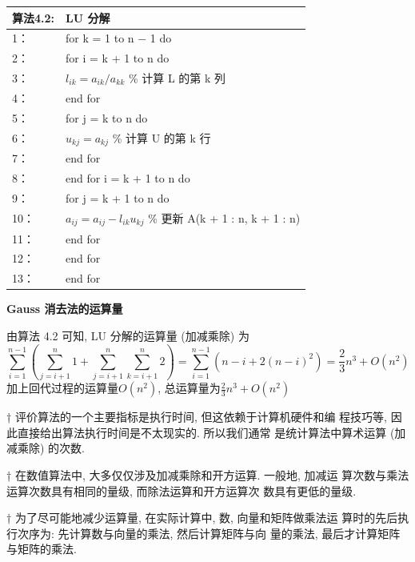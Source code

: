 \documentclass[12pt,a4paper]{article}
\begin{document}
\begin{table}  
	\begin{tabular*}{16cm}{ll}  
		\hline  
		算法4.2: &LU 分解 \\  
		\hline  
		1：   &for k = 1 to n − 1 do\\  
		2：   &\qquad for i = k + 1 to n do\\
		3：   &\qquad \qquad $l_{ik} = a_{ik}/a_{kk}$ \% 计算 L 的第 k 列\\
		4：   &\qquad end for\\
		5：   &\qquad for j = k to n do\\
		6：   &\qquad \qquad $u_{kj} = a_{kj}$ \% 计算 U 的第 k 行\\
		7：   &\qquad end for\\
		8：   &\qquad end for i = k + 1 to n do\\
		9：   & \qquad \qquad for j = k + 1 to n do\\
		10：   &\qquad \qquad \qquad $a_{ij}= a_{ij} − l_{ik}u_{kj}$ \% 更新 A(k + 1 : n, k + 1 : n)\\
		11：   &\qquad \qquad end for\\
		12：   &\qquad end for\\
		13：   &end for\\
		\hline  
	\end{tabular*}  
\end{table} 

{\bfseries Gauss 消去法的运算量}

由算法 4.2 可知, LU 分解的运算量 (加减乘除) 为
$$
\sum_{i=1}^{n-1}\left(\sum_{j=i+1}^{n} 1+\sum_{j=i+1}^{n} \sum_{k=i+1}^{n} 2\right)=\sum_{i=1}^{n-1}\left(n-i+2(n-i)^{2}\right)=\frac{2}{3} n^{3}+O\left(n^{2}\right)
$$
加上回代过程的运算量$O\left(n^{2}\right)$, 总运算量为$\frac{2}{3} n^{3}+O\left(n^{2}\right)$

\begin{framed}
	† 评价算法的一个主要指标是执行时间, 但这依赖于计算机硬件和编
	程技巧等, 因此直接给出算法执行时间是不太现实的. 所以我们通常
	是统计算法中算术运算 (加减乘除) 的次数.
\end{framed}

\begin{framed}
	† 在数值算法中, 大多仅仅涉及加减乘除和开方运算. 一般地, 加减运
	算次数与乘法运算次数具有相同的量级, 而除法运算和开方运算次
	数具有更低的量级.
\end{framed}

\begin{framed}
	† 为了尽可能地减少运算量, 在实际计算中, 数, 向量和矩阵做乘法运
	算时的先后执行次序为: 先计算数与向量的乘法, 然后计算矩阵与向
	量的乘法, 最后才计算矩阵与矩阵的乘法.
\end{framed}
\end{document}

